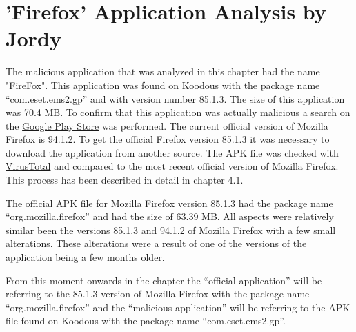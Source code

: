 \section{'Firefox' Application Analysis by Jordy}
The malicious application that was analyzed in this chapter had the name "FireFox".
This application was found on \href{https://koodous.com/apks/26a7576cc1182bf90fb16c3320d12a736b3faa10c158755605f36daae4b197b7}{Koodous} with the package name “com.eset.ems2.gp” and with version number 85.1.3.
The size of this application was 70.4 MB.
To confirm that this application was actually malicious a search on the \href{https://play.google.com/store/apps/details?id=org.mozilla.firefox&hl=nl&gl=US}{Google Play Store} was performed.
The current official version of Mozilla Firefox is 94.1.2.
To get the official Firefox version 85.1.3 it was necessary to download the application from another source.
The APK file was checked with \href{https://www.virustotal.com/gui/file/59ce0f9ea256b4576f391d01c685ced2db224a252bf09c3f362e6859a6c7ead5/details}{VirusTotal} and compared to the most recent official version of Mozilla Firefox.
This process has been described in detail in chapter 4.1.

The official APK file for Mozilla Firefox version 85.1.3 had the package name “org.mozilla.firefox” and had the size of 63.39 MB.
All aspects were relatively similar been the versions 85.1.3 and 94.1.2 of Mozilla Firefox with a few small alterations.
These alterations were a result of one of the versions of the application being a few months older.

From this moment onwards in the chapter the “official application” will be referring to the 85.1.3 version of Mozilla Firefox with the package name “org.mozilla.firefox” and the “malicious application” will be referring to the APK file found on Koodous with the package name “com.eset.ems2.gp”.